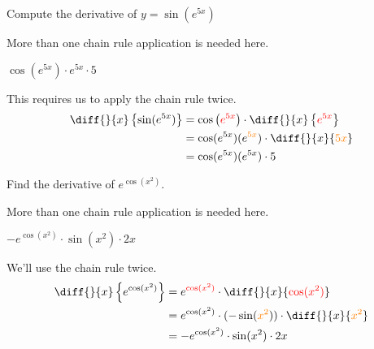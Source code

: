 \begin{question}[2015Q]
Compute the derivative of $y=\sin\left(e^{5x}\right)$
\end{question}
\begin{hint} More than one chain rule application is needed here.
\end{hint}
\begin{answer} $\cos\left(e^{5x}\right)\cdot e^{5x}\cdot 5$
\end{answer}
\begin{solution} This requires us to apply the chain rule twice.
\begin{align*}
  \diff{}{x} \left\{\sin(e^{5x}) \right\}
  &= {\cos\left(\textcolor{red}{e^{5x}}\right)} \cdot \diff{}{x} \left\{ \textcolor{red}{e^{5x}}\right\}\\
  &= \cos(e^{5x}) (e^{\textcolor{orange}{5x}}) \cdot \diff{}{x}\{\textcolor{orange}{5x}\} \\
  &= \cos(e^{5x}) (e^{5x}) \cdot5
 \end{align*}
\end{solution}


\begin{question}[2007H]
Find the derivative of $e^{\cos(x^2)}$.
\end{question}
\begin{hint}
More than one chain rule application is needed here.
\end{hint}
\begin{answer}
$-e^{\cos(x^2)}\cdot \sin(x^2) \cdot 2x$
\end{answer}
\begin{solution}
We'll use the chain rule twice.
\begin{align*}
\diff{}{x}\left\{e^{\cos(x^2)}\right\}&=
e^{\textcolor{red}{\cos(x^2)}}\cdot\diff{}{x}\{\textcolor{red}{\cos(x^2)}\}\\
&=e^{\cos(x^2)} \cdot(-\sin(\textcolor{orange}{x^2}))\cdot \diff{}{x}\{\textcolor{orange}{x^2}\}\\
&=-e^{\cos(x^2)}\cdot \sin(x^2) \cdot 2x
\end{align*}
\end{solution}





